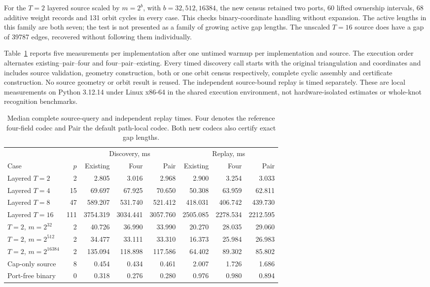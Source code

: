 For the $T=2$ layered source scaled by $m=2^b$, with
$b=32,512,16384$, the new census retained two ports, 60 lifted ownership
intervals, 68 additive weight records and 131 orbit cycles in every case.
This checks binary-coordinate handling without expansion.  The active
lengths in this family are both seven; the test is not presented as a
family of growing active gap lengths.  The unscaled $T=16$ source does
have a gap of 39787 edges, recovered without following them individually.

Table~\ref{tab:native-moment-times} reports five measurements per
implementation after one untimed warmup per implementation and source.
The execution order alternates existing--pair--four and
four--pair--existing.  Every timed discovery call starts with the original
triangulation and coordinates and includes source validation, geometry
construction, both or one orbit census respectively, complete cyclic
assembly and certificate construction.  No source geometry or orbit result
is reused.  The independent source-bound replay is timed separately.
These are local measurements on Python 3.12.14 under Linux x86-64 in the
shared execution environment, not hardware-isolated estimates or whole-knot
recognition benchmarks.

\begin{table}[H]
\centering\small
\setlength{\tabcolsep}{3pt}
\begin{tabular}{lrrrrrrr}
\toprule
& & \multicolumn{3}{c}{Discovery, ms} & \multicolumn{3}{c}{Replay, ms}\\
Case & $p$ & Existing & Four & Pair & Existing & Four & Pair\\
\midrule
Layered $T=2$ & 2 & 2.805 & 3.016 & 2.968 & 2.900 & 3.254 & 3.033 \\
Layered $T=4$ & 15 & 69.697 & 67.925 & 70.650 & 50.308 & 63.959 & 62.811 \\
Layered $T=8$ & 47 & 589.207 & 531.740 & 521.412 & 418.031 & 406.742 & 439.730 \\
Layered $T=16$ & 111 & 3754.319 & 3034.441 & 3057.760 & 2505.085 & 2278.534 & 2212.595 \\
$T=2$, $m=2^{32}$ & 2 & 40.726 & 36.990 & 33.990 & 20.270 & 28.035 & 29.060 \\
$T=2$, $m=2^{512}$ & 2 & 34.477 & 33.111 & 33.310 & 16.373 & 25.984 & 26.983 \\
$T=2$, $m=2^{16384}$ & 2 & 135.094 & 118.898 & 117.586 & 64.402 & 89.302 & 85.802 \\
Cap-only source & 8 & 0.454 & 0.434 & 0.461 & 2.007 & 1.726 & 1.686 \\
Port-free binary & 0 & 0.318 & 0.276 & 0.280 & 0.976 & 0.980 & 0.894 \\
\bottomrule
\end{tabular}
\caption{Median complete source-query and independent replay times.
Four denotes the reference four-field codec and Pair the default path-local
codec.  Both new codecs also certify exact gap lengths.}
\label{tab:native-moment-times}
\end{table}

